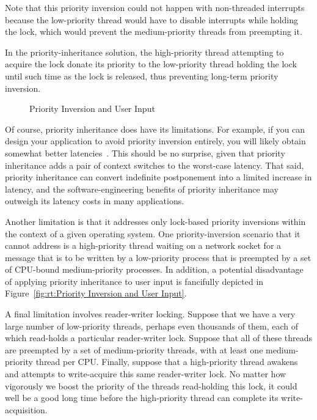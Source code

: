 Note that this priority inversion could not happen with non-threaded
interrupts because the low-priority thread would have to disable interrupts
while holding the lock, which would prevent the medium-priority
threads from preempting it.

In the priority-inheritance solution, the high-priority thread attempting
to acquire the lock donate its priority to the low-priority thread holding
the lock until such time as the lock is released, thus preventing long-term
priority inversion.

\begin{figure}[tb]
\centering
{}
\caption{Priority Inversion and User Input}
\end{figure}

Of course, priority inheritance does have its limitations.
For example, if you can design your application to avoid priority
inversion entirely, you will likely obtain somewhat better
latencies~\cite{VictorYodaiken2004a}.
This should be no surprise, given that priority inheritance adds
a pair of context switches to the worst-case latency.
That said, priority inheritance can convert indefinite postponement
into a limited increase in latency, and the software-engineering
benefits of priority inheritance may outweigh its latency costs in
many applications.

Another limitation is that it addresses only lock-based priority
inversions within the context of a given operating system.
One priority-inversion scenario that it cannot address is a high-priority
thread waiting on a network socket for a message that is to be written
by a low-priority process that is preempted by a set of CPU-bound
medium-priority processes.
In addition, a potential disadvantage of applying priority inheritance
to user input is fancifully depicted in
Figure~\ref{fig:rt:Priority Inversion and User Input}.

A final limitation involves reader-writer locking.
Suppose that we have a very large number of low-priority threads, perhaps
even thousands of them, each
of which read-holds a particular reader-writer lock.
Suppose that all of these threads are preempted by a set of medium-priority
threads, with at least one medium-priority thread per CPU.
Finally, suppose that a high-priority thread awakens and attempts to
write-acquire this same reader-writer lock.
No matter how vigorously we boost the priority of the threads read-holding
this lock, it could well be a good long time before the high-priority
thread can complete its write-acquisition.

